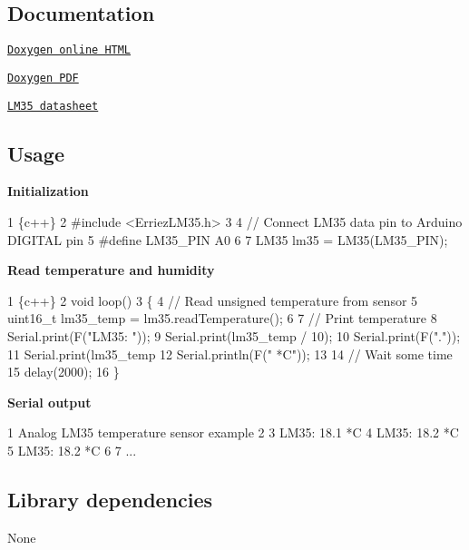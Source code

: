 \subsection*{Documentation}


\begin{DoxyItemize}
\item \href{https://erriez.github.io/ErriezLM35}{\tt Doxygen online H\+T\+ML}
\item \href{https://github.com/Erriez/ErriezLM35/raw/gh-pages/latex/ErriezLM35.pdf}{\tt Doxygen P\+DF}
\item \href{https://www.google.com/search?q=LM35+datasheet}{\tt L\+M35 datasheet}
\end{DoxyItemize}

\subsection*{Usage}

{\bfseries Initialization}


\begin{DoxyCode}
1 \{c++\}
2 #include <ErriezLM35.h>
3 
4 // Connect LM35 data pin to Arduino DIGITAL pin
5 #define LM35\_PIN   A0
6 
7 LM35 lm35 = LM35(LM35\_PIN);
\end{DoxyCode}


{\bfseries Read temperature and humidity}


\begin{DoxyCode}
1 \{c++\}
2 void loop()
3 \{
4   // Read unsigned temperature from sensor
5   uint16\_t lm35\_temp = lm35.readTemperature();
6 
7   // Print temperature
8   Serial.print(F("LM35: "));
9   Serial.print(lm35\_temp / 10);
10   Serial.print(F("."));
11   Serial.print(lm35\_temp %
12   Serial.println(F(" *C"));
13 
14   // Wait some time
15   delay(2000);
16 \}
\end{DoxyCode}


{\bfseries Serial output}


\begin{DoxyCode}
1 Analog LM35 temperature sensor example
2 
3 LM35: 18.1 *C
4 LM35: 18.2 *C
5 LM35: 18.2 *C
6 
7 ...
\end{DoxyCode}


\subsection*{Library dependencies}


\begin{DoxyItemize}
\item None
\end{DoxyItemize}

